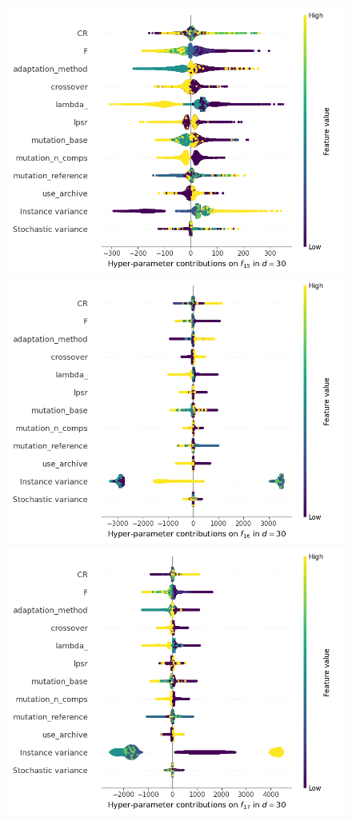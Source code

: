 \begin{figure}[t]
	\includegraphics[height=0.15\textheight,trim=60mm 0mm 30mm 0mm,clip]{de_img_new/img_summary_f15_d30.png}
	\includegraphics[height=0.15\textheight,trim=60mm 0mm 0mm 0mm,clip]{de_img_new/img_summary_f16_d30.png}
	\includegraphics[height=0.15\textheight,trim=0mm 0mm 30mm 0mm,clip]{de_img_new/img_summary_f17_d30.png}

\end{figure}
